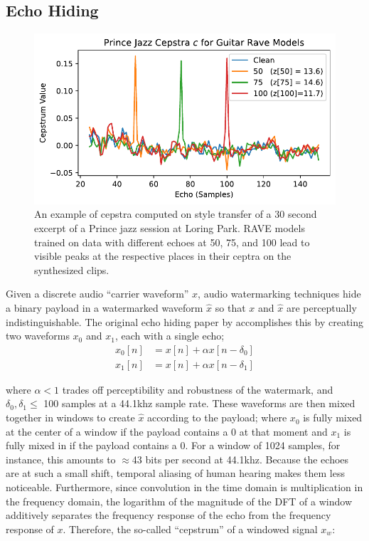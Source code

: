 \documentclass[letterpaper]{article} %
\begin{document}
\subsection{Echo Hiding}
\label{sec:echohiding}

\begin{figure}
    \centering
    \includegraphics[width=\columnwidth]{figs/RaveCepstra.pdf}
    \caption{An example of cepstra computed on style transfer of a 30 second excerpt of a Prince jazz session at Loring Park.  RAVE models trained on data with different echoes at 50, 75, and 100 lead to visible peaks at the respective places in their ceptra on the synthesized clips.}
    \label{fig:ravecepstra}
\end{figure}

Given a discrete audio ``carrier waveform'' $x$, audio watermarking techniques hide a binary payload in a watermarked waveform $\hat{x}$ so that $x$ and $\hat{x}$ are perceptually indistinguishable.  The original echo hiding paper by \cite{gruhl1996echo} accomplishes this by creating two waveforms $x_0$ and $x_1$, each with a single echo; 
\begin{equation}
    \label{eq:echohidesingle}
    \begin{aligned}
        x_0[n] &= x[n] + \alpha x[n - \delta_0] \\
        x_1[n] &= x[n] + \alpha x[n - \delta_1]
    \end{aligned}
\end{equation}

 where $\alpha < 1$ trades off perceptibility and robustness of the watermark, and $\delta_0, \delta_1 \leq $ 100 samples at a 44.1khz sample rate.  These waveforms are then mixed together in windows to create $\hat{x}$ according to the payload; where $x_0$ is fully mixed at the center of a window if the payload contains a 0 at that moment and $x_1$ is fully mixed in if the payload contains a 0.  For a window of 1024 samples, for instance, this amounts to $\approx$43 bits per second at 44.1khz.  Because the echoes are at such a small shift, temporal aliasing of human hearing makes them less noticeable.  Furthermore, since convolution in the time domain is multiplication in the frequency domain, the logarithm of the magnitude of the DFT of a window additively separates the frequency response of the echo from the frequency response of $x$.  Therefore, the so-called ``cepstrum'' of a windowed signal $x_w$:
 
\end{document}

